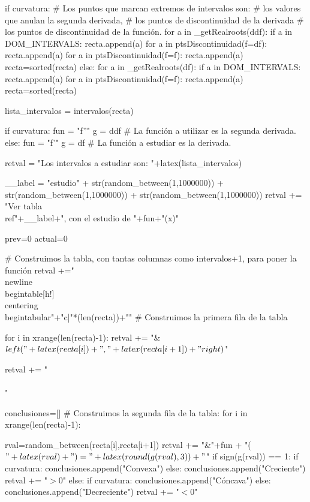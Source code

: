 \begin{sagesilent}
 
 if curvatura:
    # Los puntos que marcan extremos de intervalos son:
    #       los valores que anulan la segunda derivada, 
    #       los puntos de discontinuidad de la derivada 
    #       los puntos de discontinuidad de la función.
    for a in _getRealroots(ddf):
        if a in DOM_INTERVALS:
            recta.append(a)
    for a in ptsDiscontinuidad(f=df):
        recta.append(a)
    for a in ptsDiscontinuidad(f=f):
        recta.append(a)
    recta=sorted(recta) 
 else:
    for a in _getRealroots(df):
        if a in DOM_INTERVALS:
            recta.append(a)
    for a in ptsDiscontinuidad(f=f):
        recta.append(a)
    recta=sorted(recta) 
    
 lista_intervalos = intervalos(recta)

 if curvatura:
    fun = "f''"
    g = ddf # La función a utilizar es la segunda derivada.
 else:
    fun = "f'"
    g = df # La función a estudiar es la derivada.

 retval = "Los intervalos a estudiar son: "+latex(lista_intervalos)
 

 __label = "estudio" + str(random_between(1,1000000)) + str(random_between(1,1000000)) + str(random_between(1,1000000))
 retval += "Ver tabla \\ref{"+__label+"}, con el estudio de "+fun+"(x)"


 prev=0
 actual=0
 
 # Construimos la tabla, con tantas columnas como intervalos+1, para poner la función
 retval +="\\newline\\begin{table}[h!]\\centering\\begin{tabular}{"+"c|"*(len(recta))+"}"
 # Construimos la primera fila de la tabla
 
 
 for i in xrange(len(recta)-1):
  retval += "& $\\left("+latex(recta[i])+","+latex(recta[i+1])+"\\right)$"

 retval += "\\\\ "
 
 conclusiones=[]
 # Construimos la segunda fila de la tabla:
 for i in xrange(len(recta)-1):
  
  rval=random_between(recta[i],recta[i+1])
  retval += "&"+fun + "($"+latex(rval)+") = "+latex(round(g(rval),3)) +"$"
  if sign(g(rval)) == 1:
    if curvatura:
        conclusiones.append("Convexa")
    else: 
        conclusiones.append("Creciente")
    retval += "$>0$"
  else:
    if curvatura:
        conclusiones.append("Cóncava")
    else:
        conclusiones.append("Decreciente")
    retval += "$<0$"
  


\end{sagesilent}
